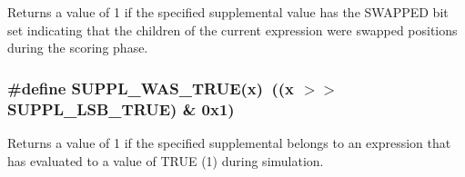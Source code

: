 Returns a value of 1 if the specified supplemental value has the SWAPPED bit set indicating that the children of the current expression were swapped positions during the scoring phase. 
\subsubsection{\setlength{\rightskip}{0pt plus 5cm}\#define SUPPL\_\-WAS\_\-TRUE(x)\ ((x $>$$>$ SUPPL\_\-LSB\_\-TRUE) \& 0x1)}\label{group__expr__suppl_a29}


Returns a value of 1 if the specified supplemental belongs to an expression that has evaluated to a value of TRUE (1) during simulation. 